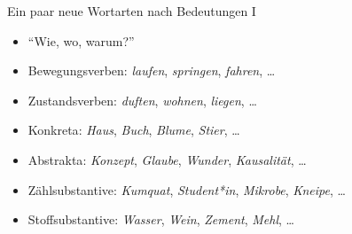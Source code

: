 \begin{frame}
  {Ein paar neue Wortarten nach Bedeutungen I}
  \pause
  \begin{itemize}[<+->]
    \item "`Wie, wo, warum?"' 
      \Halbzeile
      \pause
    \item \alert{Bewegungsverben}: \textit{laufen}, \textit{springen}, \textit{fahren}, \dots
    \item \alert{Zustandsverben}: \textit{duften}, \textit{wohnen}, \textit{liegen}, \dots
      \Halbzeile
    \item \alert{Konkreta}: \textit{Haus}, \textit{Buch}, \textit{Blume}, \textit{Stier}, \dots
    \item \alert{Abstrakta}: \textit{Konzept}, \textit{Glaube}, \textit{Wunder}, \textit{Kausalität}, \dots
      \Halbzeile
    \item \alert{Zählsubstantive}: \textit{Kumquat}, \textit{Student*in}, \textit{Mikrobe}, \textit{Kneipe}, \dots
    \item \alert{Stoffsubstantive}: \textit{Wasser}, \textit{Wein}, \textit{Zement}, \textit{Mehl}, \dots
  \end{itemize}
\end{frame}


